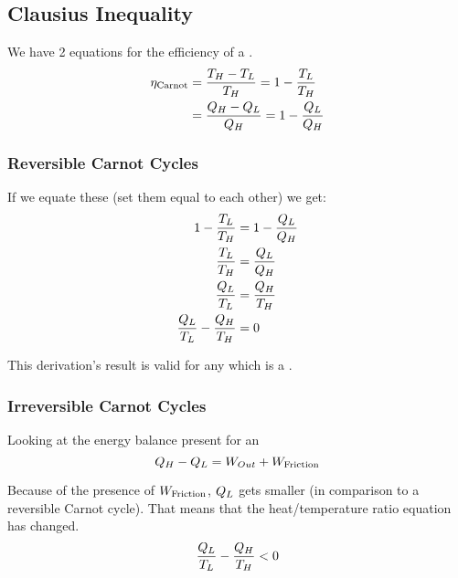 \subsection{Clausius Inequality}\label{subsec:Clausius_Inequality}
We have 2 equations for the efficiency of a .
\begin{align*}
  \eta_{\text{Carnot}} &= \frac{T_{H} - T_{L}}{T_{H}} = 1 - \frac{T_{L}}{T_{H}} \\
                              &= \frac{Q_{H} - Q_{L}}{Q_{H}} = 1 - \frac{Q_{L}}{Q_{H}}
\end{align*}

\subsubsection{Reversible Carnot Cycles}\label{subsubsec:Reversible_Carnot_Cycles}
If we equate these (set them equal to each other) we get:
\begin{align*}
  1 - \frac{T_{L}}{T_{H}} &= 1 - \frac{Q_{L}}{Q_{H}} \\
  \frac{T_{L}}{T_{H}} &= \frac{Q_{L}}{Q_{H}} \\
  \frac{Q_{L}}{T_{L}} &= \frac{Q_{H}}{T_{H}} \\
  \frac{Q_{L}}{T_{L}} - \frac{Q_{H}}{T_{H}} &= 0
\end{align*}

This derivation's result is valid for any  which is a .

\subsubsection{Irreversible Carnot Cycles}\label{subsubsec:Irreversible_Carnot_Cycles}
Looking at the energy balance present for an 
\begin{equation*}
  Q_{H} - Q_{L} = W_{Out} + W_{\text{Friction}}
\end{equation*}

Because of the presence of $W_{\text{Friction}}$, $Q_{L}$ gets smaller (in comparison to a reversible Carnot cycle).
That means that the heat/temperature ratio equation has changed.
\begin{equation*}
  \frac{Q_{L}}{T_{L}} - \frac{Q_{H}}{T_{H}} < 0
\end{equation*}


